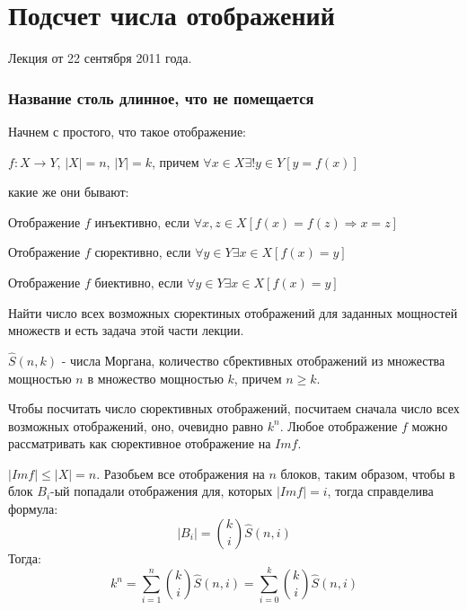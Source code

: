 \chapter{Подсчет числа отображений}

Лекция от 22 сентября 2011 года.

\subsection{Название столь длинное, что не помещается}

Начнем с простого, что такое отображение:

\begin{Def}
$f : X \rightarrow Y$, $\left|X\right|=n$, $\left|Y\right|=k$, причем $\forall x \in X \exists ! y \in Y [y = f\left(x\right)]$
\end{Def}

какие же они бывают:

\begin{Def}
Отображение $f$ инъективно, если $\forall x,z \in X [f\left(x\right)=f\left(z\right) \Rightarrow x=z]$
\end{Def}

\begin{Def}
Отображение $f$ сюрективно, если $\forall y \in Y \exists x \in X [f\left(x\right)=y]$
\end{Def}

\begin{Def}
Отображение $f$ биективно, если $\forall y \in Y \exists x \in X [f\left(x\right)=y]$
\end{Def}

Найти число всех возможных сюректиных отображений для заданных мощностей множеств и есть задача этой части лекции.

\begin{Def}
$\hat S \left(n,k\right)$ - числа Моргана, количество сбрективных отображений из множества мощностью $n$ в множество мощностью $k$, причем $n \ge k$.
\end{Def}

Чтобы посчитать число сюрективных отображений, посчитаем сначала число всех возможных отображений, оно, очевидно равно $k^n$. Любое отображение $f$ можно рассматривать как сюрективное отображение на $Im f$.

$\left|Im f\right| \le \left|X\right| = n$. Разобьем все отображения на $n$ блоков, таким образом, чтобы в блок $B_i$-ый попадали отображения для, которых $\left|Im f\right|=i$, тогда справделива формула:
\[
	\left| B_i \right| = \binom{k}{i} \hat S \left(n,i\right)
\]
Тогда:
\[
	k^n = \sum_{i=1}^n \binom{k}{i} \hat S \left(n,i\right) = \sum_{i=0}^k \binom{k}{i} \hat S \left(n,i\right)
\]


